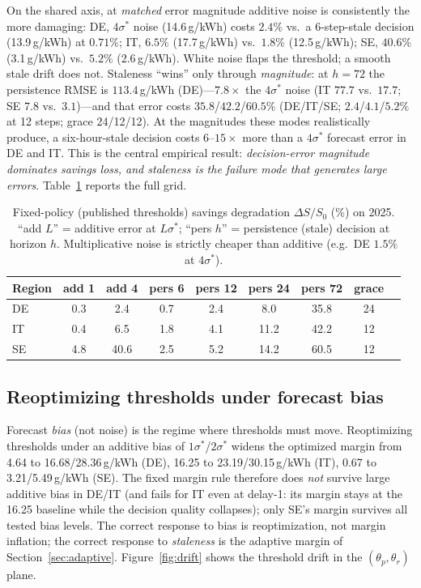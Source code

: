 \documentclass[sigconf,nonacm=false]{acmart}
\begin{document}
On the shared axis, at \emph{matched} error magnitude additive noise is
consistently the more damaging: DE, $4\sigma^*$ noise (14.6\,g/kWh) costs
$2.4\%$ vs.\ a 6-step-stale decision (13.9\,g/kWh) at $0.71\%$; IT, $6.5\%$
(17.7\,g/kWh) vs.\ $1.8\%$ (12.5\,g/kWh); SE, $40.6\%$ (3.1\,g/kWh) vs.\ $5.2\%$
(2.6\,g/kWh). White noise flaps the threshold; a smooth stale drift does not.
Staleness ``wins'' only through \emph{magnitude}: at $h{=}72$ the persistence
RMSE is $113.4$\,g/kWh (DE)---$7.8\times$ the $4\sigma^*$ noise (IT $77.7$ vs.\
$17.7$; SE $7.8$ vs.\ $3.1$)---and that error costs $35.8$/$42.2$/$60.5\%$
(DE/IT/SE; $2.4$/$4.1$/$5.2\%$ at 12 steps; grace 24/12/12). At the magnitudes
these modes realistically produce, a six-hour-stale decision costs $6$--$15\times$
more than a $4\sigma^*$ forecast error in DE and IT. This is the central
empirical result: \emph{decision-error magnitude dominates savings loss, and
staleness is the failure mode that generates large errors}.
Table~\ref{tab:degrad} reports the full grid.

\begin{table}[t]
  \caption{Fixed-policy (published thresholds) savings degradation
  $\Delta S/S_0$ (\%) on 2025. ``add $L$'' = additive error at
  $L\sigma^*$; ``pers $h$'' = persistence (stale) decision at horizon $h$.
  Multiplicative noise is strictly cheaper than additive (e.g.\ DE $1.5\%$
  at $4\sigma^*$).}
  \label{tab:degrad}
  \footnotesize
  \begin{tabular}{@{}l c c c c c c c c@{}}
    \toprule
    Region & add 1 & add 4 & pers 6 & pers 12 & pers 24 & pers 72 & grace \\
    \midrule
    DE & 0.3 & 2.4 & 0.7 & 2.4 & 8.0 & 35.8 & 24 \\
    IT & 0.4 & 6.5 & 1.8 & 4.1 & 11.2 & 42.2 & 12 \\
    SE & 4.8 & 40.6 & 2.5 & 5.2 & 14.2 & 60.5 & 12 \\
    \bottomrule
  \end{tabular}
\end{table}

\subsection{Reoptimizing thresholds under forecast bias}
Forecast \emph{bias} (not noise) is the regime where thresholds must move.
Reoptimizing thresholds under an additive bias of $1\sigma^*$/$2\sigma^*$ widens
the optimized margin from 4.64 to 16.68/28.36\,g/kWh (DE), 16.25 to
23.19/30.15\,g/kWh (IT), 0.67 to 3.21/5.49\,g/kWh (SE). The fixed margin rule
therefore does \emph{not} survive large additive bias in DE/IT (and fails for IT
even at delay-1: its margin stays at the 16.25 baseline while the decision
quality collapses); only SE's margin survives all tested bias levels. The correct
response to bias is reoptimization, not margin inflation; the correct response
to \emph{staleness} is the adaptive margin of Section~\ref{sec:adaptive}.
Figure~\ref{fig:drift} shows the threshold drift in the $(\theta_p,\theta_r)$
plane.
\end{document}
